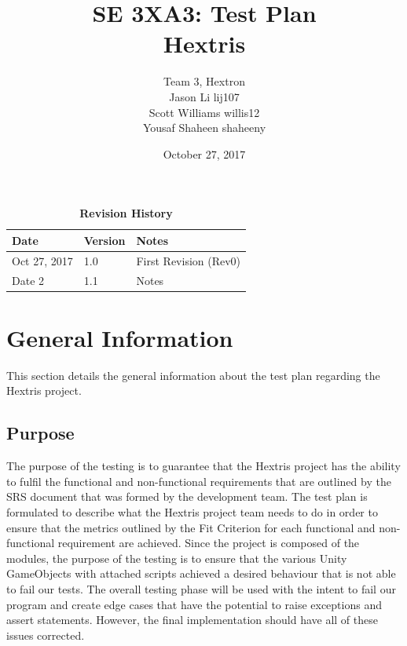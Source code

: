 \documentclass[12pt, titlepage]{article}
\title{SE 3XA3: Test Plan\\Hextris}
\author{Team 3, Hextron
		\\ Jason Li lij107
		\\ Scott Williams willis12
		\\ Yousaf Shaheen shaheeny
}
\date{October 27, 2017}
\begin{document}
\maketitle

\tableofcontents
\listoffigures


\begin{table}[bp]
\caption{\bf Revision History}
\begin{tabularx}{\textwidth}{p{3cm}p{2cm}X}
\toprule {\bf Date} & {\bf Version} & {\bf Notes}\\
\midrule
Oct 27, 2017 & 1.0 & First Revision (Rev0)\\
Date 2 & 1.1 & Notes\\
\bottomrule
\end{tabularx}
\end{table}

\newpage


\section{General Information}
\noindent This section details the general information about the test plan regarding the Hextris project.

\subsection{Purpose}
The purpose of the testing is to guarantee that the Hextris project has the ability to fulfil the functional and non-functional requirements that are outlined by the SRS document that was formed by the development team. The test plan is formulated to describe what the Hextris project team needs to do in order to ensure that the metrics outlined by the Fit Criterion for each functional and non-functional requirement are achieved. Since the project is composed of the modules, the purpose of the testing is to ensure that the various Unity GameObjects with attached scripts achieved a desired behaviour that is not able to fail our tests. The overall testing phase will be used with the intent to fail our program and create edge cases that have the potential to raise exceptions and assert statements. However, the final implementation should have all of these issues corrected. 
\end{document}
